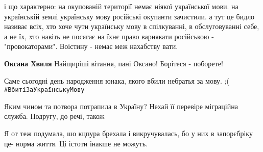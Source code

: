 \begin{itemize}
\begin{itemize}
 

і що характерно: на окупованій території немає ніякої української мови. на
українській землі українську мову російські окупанти зачистили. а тут це бидло
називає всіх, хто хоче чути українську мову в спілкуванні, в обслуговуванні
себе, а не їх, хто навіть не посягає на їхнє право варнякати російською -
"провокаторами". Воістину - немає меж нахабству вати.

\end{itemize}

 
\textbf{Оксана Хвиля}
Найщиріші вітання, пані Оксано! \Smiley[1.0][yellow] Борітеся - поборете!

 
Саме сьогодні день народження юнака, якого вбили небратья за мову. ;(
\verb|#ВбитіЗаУкраїнськуМову|

 
Яким чином та потвора потрапила в Україну? Нехай її перевіре міграційна служба. Подругу, до речі, також

 

Я от теж подумала, шо кцпура брехала і викручувалась, бо у них в запорєбріку
це- норма життя. Ці істоти інакше не можуть.


\end{itemize}

